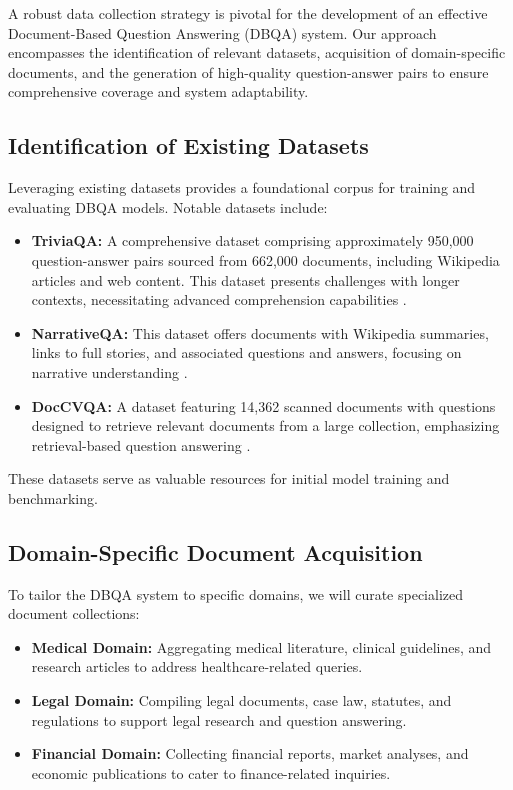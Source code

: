 \documentclass[sigconf]{acmart}
\begin{document}
A robust data collection strategy is pivotal for the development of an effective Document-Based Question Answering (DBQA) system. Our approach encompasses the identification of relevant datasets, acquisition of domain-specific documents, and the generation of high-quality question-answer pairs to ensure comprehensive coverage and system adaptability.

\subsection{Identification of Existing Datasets}

Leveraging existing datasets provides a foundational corpus for training and evaluating DBQA models. Notable datasets include:

\begin{itemize}
    \item \textbf{TriviaQA:} A comprehensive dataset comprising approximately 950,000 question-answer pairs sourced from 662,000 documents, including Wikipedia articles and web content. This dataset presents challenges with longer contexts, necessitating advanced comprehension capabilities \cite{turn0search3}.
    \item \textbf{NarrativeQA:} This dataset offers documents with Wikipedia summaries, links to full stories, and associated questions and answers, focusing on narrative understanding \cite{turn0search2}.
    \item \textbf{DocCVQA:} A dataset featuring 14,362 scanned documents with questions designed to retrieve relevant documents from a large collection, emphasizing retrieval-based question answering \cite{turn0search6}.
\end{itemize}

These datasets serve as valuable resources for initial model training and benchmarking.

\subsection{Domain-Specific Document Acquisition}

To tailor the DBQA system to specific domains, we will curate specialized document collections:

\begin{itemize}
    \item \textbf{Medical Domain:} Aggregating medical literature, clinical guidelines, and research articles to address healthcare-related queries.
    \item \textbf{Legal Domain:} Compiling legal documents, case law, statutes, and regulations to support legal research and question answering.
    \item \textbf{Financial Domain:} Collecting financial reports, market analyses, and economic publications to cater to finance-related inquiries.
\end{itemize}
\end{document}
